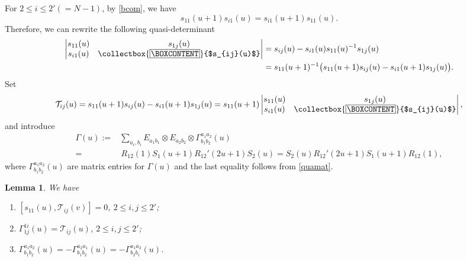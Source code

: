 \documentclass[11pt,reqno]{amsart}
\newcommand{\mybox}{%
    \collectbox{%
        \setlength{\fboxsep}{1pt}%
        \fbox{\BOXCONTENT}%
    }%
}
\numberwithin{equation}{section}
\newtheorem{lem}[thm]{Lemma}
\theoremstyle{definition}
\theoremstyle{remark}
\newcommand{\beq}{\begin{equation}}
\newcommand{\eeq}{\end{equation}}
\newcommand{\mc}{\mathcal}
\newcommand{\lle}{\leqslant}
\begin{document}
For $2\lle  i\lle 2' (=N-1)$, by \eqref{bcom}, we have 
\beq\label{emrel1}
s_{11}(u+1)s_{i 1}(u)=s_{i1}(u+1)s_{11}(u).
\eeq
Therefore, we can rewrite the following quasi-determinant
\begin{align*}
\begin{vmatrix}s_{11}(u) & s_{1j}(u)\\
s_{i1}(u) & \mybox{$s_{ij}(u)$}\end{vmatrix}&=s_{ij}(u)-s_{i1}(u)s_{11}(u)^{-1}s_{1j}(u)\\
&=s_{11}(u+1)^{-1}\big(s_{11}(u+1)s_{ij}(u)-s_{i1}(u+1)s_{1j}(u)\big).
\end{align*}
Set 
\beq\label{newt}
\mc T_{ij}(u)=s_{11}(u+1)s_{ij}(u)-s_{i1}(u+1)s_{1j}(u)=s_{11}(u+1)\begin{vmatrix}s_{11}(u) & s_{1j}(u)\\
s_{i1}(u) & \mybox{$s_{ij}(u)$}\end{vmatrix},
\eeq
and introduce
\beq\label{gamma}
\begin{split}
\Gamma(u):=&\sum_{a_i,b_i}E_{a_1b_1}\otimes E_{a_2b_2}\otimes \Gamma_{b_1b_2}^{a_1a_2}(u)\\
=&\,R_{12}(1)S_1(u+1){R}_{12}'(2u+1)S_2(u)
=S_2(u){R}_{12}'(2u+1)S_1(u+1)R_{12}(1),
\end{split}
\eeq
where $\Gamma_{b_1b_2}^{a_1a_2}(u)$ are matrix entries for $\Gamma(u)$ and the last equality follows from \eqref{quamat}.
\begin{lem}\label{Blem}
We have
\begin{enumerate}
    \item  $[s_{11}(u),\mc T_{ij}(v)]=0$, $2\lle i,j\lle 2'$;
\item $\Gamma_{1j}^{1i}(u)=\mc T_{ij}(u)$, $2\lle i,j\lle 2'$;
\item $\Gamma_{b_1b_2}^{a_1a_2}(u)=-\Gamma_{b_1b_2}^{a_2a_1}(u)=-\Gamma_{b_2b_1}^{a_1a_2}(u)$.
\end{enumerate}
\end{lem}
\end{document}
